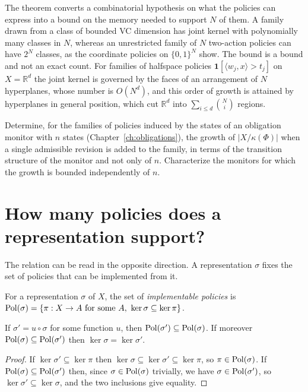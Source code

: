 The theorem converts a combinatorial hypothesis on what the policies can express into a bound on the memory needed to support $N$ of them. A family drawn from a class of bounded VC dimension has joint kernel with polynomially many classes in $N$, whereas an unrestricted family of $N$ two-action policies can have $2^{N}$ classes, as the coordinate policies on $\{0,1\}^{N}$ show. The bound is a bound and not an exact count. For families of halfspace policies $\mathbf 1[\langle w_j,x\rangle>t_j]$ on $X=\mathbb R^{d}$ the joint kernel is governed by the faces of an arrangement of $N$ hyperplanes, whose number is $O(N^{d})$, and this order of growth is attained by hyperplanes in general position, which cut $\mathbb R^{d}$ into $\sum_{i\le d}\binom{N}{i}$ regions.

\begin{researchproblem}\label{rp:families}
Determine, for the families of policies induced by the states of an obligation monitor with $n$ states (Chapter~\ref{ch:obligations}), the growth of $|X/\kappa(\Phi)|$ when a single admissible revision is added to the family, in terms of the transition structure of the monitor and not only of $n$. Characterize the monitors for which the growth is bounded independently of $n$.
\end{researchproblem}

\section{How many policies does a representation support?}

The relation can be read in the opposite direction. A representation $\sigma$ fixes the set of policies that can be implemented from it.

\begin{definition}\label{def:implementable}
For a representation $\sigma$ of $X$, the set of \emph{implementable policies} is $\Pol(\sigma)=\{\pi:X\to A\text{ for some }A,\ \ker\sigma\subseteq\ker\pi\}$.
\end{definition}

\begin{established}\label{prop:contraction}
If $\sigma'=u\circ\sigma$ for some function $u$, then $\mathrm{Pol}(\sigma')\subseteq\mathrm{Pol}(\sigma)$. If moreover $\mathrm{Pol}(\sigma)\subseteq\mathrm{Pol}(\sigma')$ then $\ker\sigma=\ker\sigma'$.
\end{established}
\begin{proof}
If $\ker\sigma'\subseteq\ker\pi$ then $\ker\sigma\subseteq\ker\sigma'\subseteq\ker\pi$, so $\pi\in\mathrm{Pol}(\sigma)$. If $\mathrm{Pol}(\sigma)\subseteq\mathrm{Pol}(\sigma')$ then, since $\sigma\in\mathrm{Pol}(\sigma)$ trivially, we have $\sigma\in\mathrm{Pol}(\sigma')$, so $\ker\sigma'\subseteq\ker\sigma$, and the two inclusions give equality.
\end{proof}

